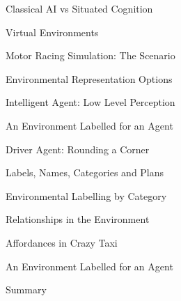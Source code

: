 \documentclass[aspectratio=1610,xcolor=dvipsnames,t]{beamer}
\begin{document}
\begin{frame}{Classical AI vs Situated Cognition}
\end{frame} 

\begin{frame}{Virtual Environments}
\end{frame}

\begin{frame}{Motor Racing Simulation: The Scenario}
\end{frame} 

\begin{frame}{Environmental Representation Options} 
\end{frame} 

\begin{frame}{Intelligent Agent: Low Level Perception}
\end{frame} 

\begin{frame}{An Environment Labelled for an Agent}
\end{frame} 

\begin{frame}{Driver Agent: Rounding a Corner}
\end{frame} 

\begin{frame}{Labels, Names, Categories and Plans}
\end{frame} 

\begin{frame}{Environmental Labelling by Category} 
\end{frame}

\begin{frame}{Relationships in the Environment}
\end{frame}

\begin{frame}{Affordances in Crazy Taxi} 
\end{frame} 

\begin{frame}{An Environment Labelled for an Agent} 
\end{frame} 

\begin{frame}{Summary}
\end{frame} 
\end{document}
